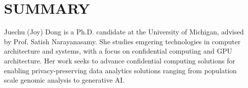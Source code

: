 \section{SUMMARY}
Juechu (Joy) Dong is a Ph.D. candidate at the University of Michigan, advised by Prof. Satish Narayanasamy. 
She studies emgering technologies in computer architecture and systems, with a focus on confidential computing and GPU architecture. Her work seeks to advance confidential computing solutions for enabling privacy-preserving data analytics solutions ranging from population scale genomic analysis to generative AI. 